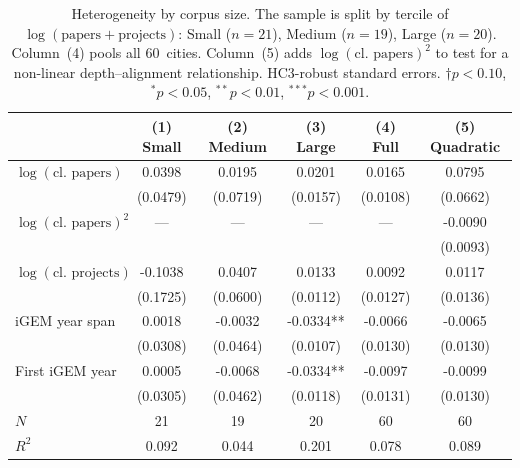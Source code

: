 \begin{table}[htbp]
\centering
\caption{Heterogeneity by corpus size. The sample is split by tercile of $\log(\text{papers} + \text{projects})$: Small ($n=21$), Medium ($n=19$), Large ($n=20$). Column~(4) pools all 60~cities. Column~(5) adds $\log(\text{cl.\ papers})^2$ to test for a non-linear depth--alignment relationship. HC3-robust standard errors. $\dagger p<0.10$, $^{*}p<0.05$, $^{**}p<0.01$, $^{***}p<0.001$.}
\label{tab:tercile}
\begin{tabular}{lccccc}
\toprule
& (1) Small & (2) Medium & (3) Large & (4) Full & (5) Quadratic \\
\midrule
$\log(\text{cl.\ papers})$ & 0.0398 & 0.0195 & 0.0201 & 0.0165 & 0.0795 \\
& (0.0479) & (0.0719) & (0.0157) & (0.0108) & (0.0662) \\[4pt]
$\log(\text{cl.\ papers})^2$ & — & — & — & — & -0.0090 \\
&  &  &  &  & (0.0093) \\[4pt]
$\log(\text{cl.\ projects})$ & -0.1038 & 0.0407 & 0.0133 & 0.0092 & 0.0117 \\
& (0.1725) & (0.0600) & (0.0112) & (0.0127) & (0.0136) \\[4pt]
iGEM year span & 0.0018 & -0.0032 & -0.0334** & -0.0066 & -0.0065 \\
& (0.0308) & (0.0464) & (0.0107) & (0.0130) & (0.0130) \\[4pt]
First iGEM year & 0.0005 & -0.0068 & -0.0334** & -0.0097 & -0.0099 \\
& (0.0305) & (0.0462) & (0.0118) & (0.0131) & (0.0130) \\[4pt]
\midrule
$N$ & 21 & 19 & 20 & 60 & 60 \\
$R^2$ & 0.092 & 0.044 & 0.201 & 0.078 & 0.089 \\
\bottomrule
\end{tabular}
\end{table}